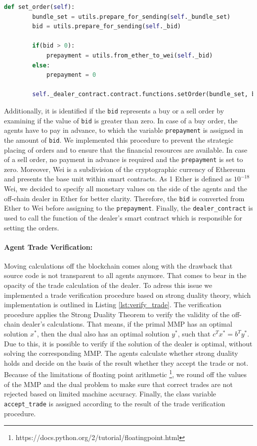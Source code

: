 \begin{lstlisting}[float=htbp, label=lst:set_order, caption=Submitting of Order to Smart Contract Dealer, language=Python]
    def set_order(self):
        bundle_set = utils.prepare_for_sending(self._bundle_set)
        bid = utils.prepare_for_sending(self._bid)
        
        if(bid > 0):
            prepayment = utils.from_ether_to_wei(self._bid)
        else:
            prepayment = 0

        self._dealer_contract.contract.functions.setOrder(bundle_set, bid, prepayment).transact({'from': self._account_address, 'value': prepayment})
\end{lstlisting}

Additionally, it is identified if the \verb|bid| represents a buy or a sell order by examining if the value 
of \verb|bid| is greater than zero. In case of a buy order, the agents have to pay in advance, to which 
the variable \verb|prepayment| is assigned in the amount of \verb|bid|.
We implemented this procedure to prevent the strategic placing of orders and to ensure 
that the financial resources are available.
In case of a sell order, no payment in advance is required and the \verb|prepayment| is set to zero.
Moreover, Wei is a subdivision of the cryptographic currency of Ethereum and presents the base unit within smart contracts.
As 1 Ether is defined as $10^{-18}$ Wei, we decided to specify all monetary values on the side 
of the agents and the off-chain dealer in Ether for better clarity.
Therefore, the \verb|bid| is converted from Ether to Wei before assigning to the \verb|prepayment|.
Finally, the \verb|dealer_contract| is used to call the function of the dealer's smart contract which is
responsible for setting the orders.

\paragraph{Agent Trade Verification:} Moving calculations off the blockchain comes along with the drawback that source code is not
transparent to all agents anymore. 
That comes to bear in the opacity of the trade calculation of the dealer. 
To adress this issue we implemented a trade verification procedure based on 
strong duality theory, which implementation is outlined in Listing \ref{lst:verify_trade}.
The verification procedure applies the Strong Duality Theorem to verify the validity of the off-chain dealer's calculations.
That means, if the primal MMP has an optimal solution $x^{*}$, then 
the dual also has an optimal solution $y^{*}$, such that $c^{T}x^{*} = b^{T}y^{*}$.
Due to this, it is possible to verify if the solution of the dealer is optimal, without solving the corresponding MMP. 
The agents calculate whether strong duality holds and decide on the basis of the result whether they accept the trade or not.
Because of the limitations of floating point arithmetic \footnote{https://docs.python.org/2/tutorial/floatingpoint.html}, 
we round off the values of the MMP and the dual problem to make sure that correct trades 
are not rejected based on limited machine accuracy.
Finally, the class variable \verb|accept_trade| is assigned according to the result of the trade verification 
procedure.

